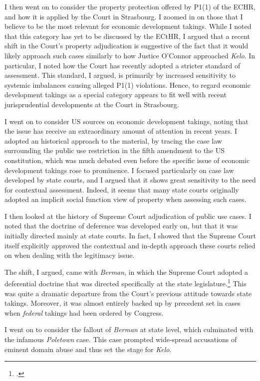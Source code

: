 I then went on to consider the property protection offered by P1(1) of the ECHR, and how it is applied by the Court in Strasbourg. I zoomed in on those  that I believe to be the most relevant for economic development takings. While I noted that this category has yet to be discussed by the ECtHR, I argued that a recent shift in the Court's property adjudication is suggestive of the fact that it would likely approach such cases similarly to how Justice O'Connor approached {\it Kelo}. In particular, I noted how the Court has recently adopted a stricter standard of assessment. This standard, I argued, is  primarily by increased sensitivity to systemic imbalances causing alleged P1(1) violations. Hence, to regard economic development takings as a special category appears to fit well with recent jurisprudential developments at the Court in Strasbourg.

I went on to consider US sources on economic development takings, noting that the issue has receive an extraordinary amount of attention in recent years. I adopted an historical approach to the material, by tracing the case law surrounding the public use restriction in the fifth amendment to the US constitution, which was much debated even before the specific issue of economic development takings rose to prominence. I focused particularly on case law developed by state courts, and I argued that it shows great sensitivity to the need for contextual assessment. Indeed, it seems that many state courts originally adopted an implicit social function view of property when assessing such cases.

I then looked at the history of Supreme Court adjudication of public use cases. I noted that the doctrine of deference was developed early on, but that it was initially directed mainly at state courts. In fact, I showed that the Supreme Court itself explicitly approved the contextual and in-depth approach these courts relied on when dealing with the legitimacy issue.

The shift, I argued, came with {\it Berman}, in which the Supreme Court adopted a deferential doctrine that was directed specifically at the state legislature.\footcite{berman54} This was quite a dramatic departure from the Court's previous attitude towards state takings. Moreover, it was almost entirely backed up by precedent set in cases when {\it federal} takings had been ordered by Congress.

I went on to consider the fallout of {\it Berman} at state level, which culminated with the infamous {\it Poletown} case. This case prompted wide-spread accusations of eminent domain abuse and thus set the stage for {\it Kelo}.

